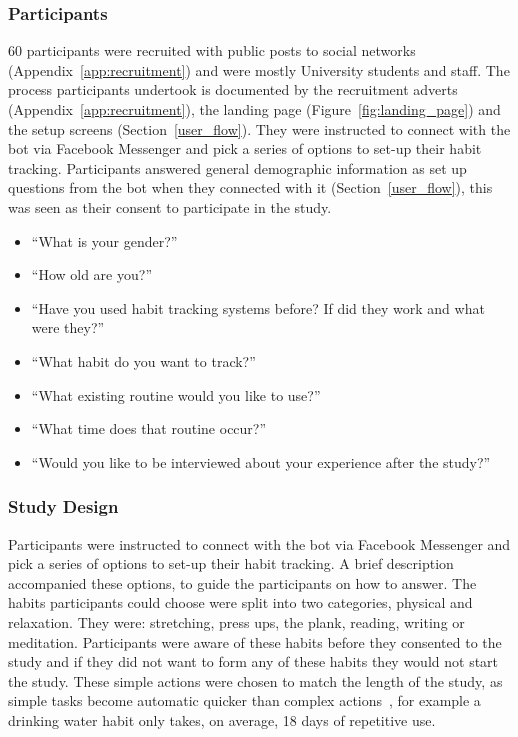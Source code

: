 \subsubsection{Participants}
60 participants were recruited with public posts to social networks (Appendix~\ref{app:recruitment}) and were mostly University students and staff. The process participants undertook is documented by the recruitment adverts (Appendix~\ref{app:recruitment}), the landing page (Figure~\ref{fig:landing_page}) and the setup screens (Section~\ref{user_flow}). They were instructed to connect with the bot via Facebook Messenger and pick a series of options to set-up their habit tracking. Participants answered general demographic information as set up questions from the bot when they connected with it (Section~\ref{user_flow}), this was seen as their consent to participate in the study.

\begin{itemize}
  \item ``What is your gender?''
    \item ``How old are you?''
    \item ``Have you used habit tracking systems before? If did they work and what were they?''
    \item ``What habit do you want to track?''
    \item ``What existing routine would you like to use?''
    \item ``What time does that routine occur?''
    \item ``Would you like to be interviewed about your experience after the study?''
\end{itemize}


\subsubsection{Study Design}
Participants were instructed to connect with the bot via Facebook Messenger and pick a series of options to set-up their habit tracking. A brief description accompanied these options, to guide the participants on how to answer. The habits participants could choose were split into two categories, physical and relaxation. They were: stretching, press ups, the plank, reading, writing or meditation. Participants were aware of these habits before they consented to the study and if they did not want to form any of these habits they would not start the study. These simple actions were chosen to match the length of the study, as simple tasks become automatic quicker than complex actions~\cite{article_how_habits_formed_modelling_habit_formation}, for example a drinking water habit only takes, on average, 18 days of repetitive use.

